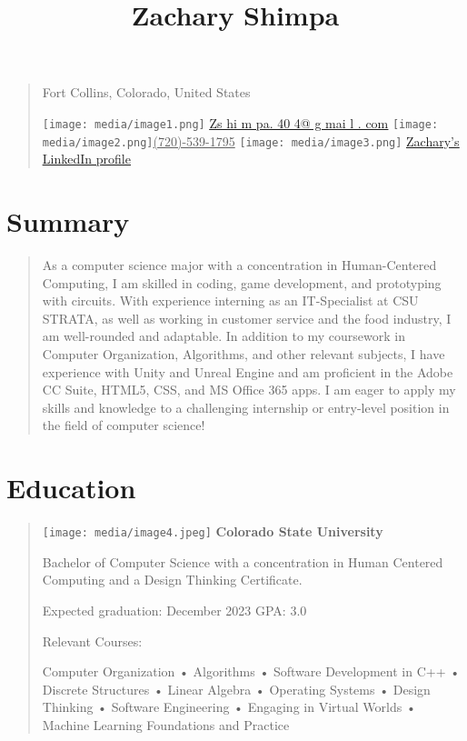 \documentclass[
]{article}
\title{Zachary Shimpa}
\author{}
\date{}
\begin{document}
\maketitle

\begin{quote}
Fort Collins, Colorado, United States

\texttt{[image: media/image1.png]}
\href{mailto:Zshimpa.404@gmail.com}{\uline{Zs hi m pa. 40 4@ g mai l .
com}}
\texttt{[image: media/image2.png]}\uline{(720)-539-1795}
\texttt{[image: media/image3.png]}
\href{https://www.linkedin.com/in/zachary-shimpa-5802aa196}{\uline{Zachary's
LinkedIn profile}}
\end{quote}

\hypertarget{summary}{%
\section{Summary}\label{summary}}

\begin{quote}
As a computer science major with a concentration in Human-Centered
Computing, I am skilled in coding, game development, and prototyping
with circuits. With experience interning as an IT-Specialist at CSU
STRATA, as well as working in customer service and the food industry, I
am well-rounded and adaptable. In addition to my coursework in Computer
Organization, Algorithms, and other relevant subjects, I have experience
with Unity and Unreal Engine and am proficient in the Adobe CC Suite,
HTML5, CSS, and MS Office 365 apps. I am eager to apply my skills and
knowledge to a challenging internship or entry-level position in the
field of computer science!
\end{quote}

\hypertarget{education}{%
\section{Education}\label{education}}

\begin{quote}
\texttt{[image: media/image4.jpeg]}
\textbf{Colorado State University}

Bachelor of Computer Science with a concentration in Human Centered
Computing and a Design Thinking Certificate.

Expected graduation: December 2023 \textbar{} GPA: 3.0

Relevant Courses:

Computer Organization • Algorithms • Software Development in C++ •
Discrete Structures • Linear Algebra • Operating Systems • Design
Thinking • Software Engineering • Engaging in Virtual Worlds • Machine
Learning Foundations and Practice
\end{quote}
\end{document}
